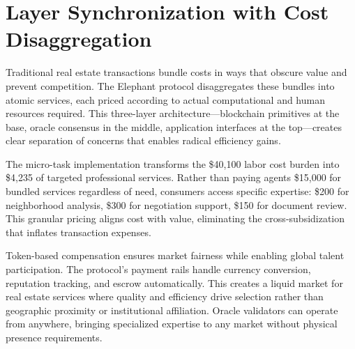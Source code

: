 \section{Layer Synchronization with Cost Disaggregation}

Traditional real estate transactions bundle costs in ways that obscure value and prevent competition. The Elephant protocol disaggregates these bundles into atomic services, each priced according to actual computational and human resources required. This three-layer architecture—blockchain primitives at the base, oracle consensus in the middle, application interfaces at the top—creates clear separation of concerns that enables radical efficiency gains.

The micro-task implementation transforms the \$40{,}100 labor cost burden into \$4{,}235 of targeted professional services. Rather than paying agents \$15{,}000 for bundled services regardless of need, consumers access specific expertise: \$200 for neighborhood analysis, \$300 for negotiation support, \$150 for document review. This granular pricing aligns cost with value, eliminating the cross-subsidization that inflates transaction expenses.

Token-based compensation ensures market fairness while enabling global talent participation. The protocol's payment rails handle currency conversion, reputation tracking, and escrow automatically. This creates a liquid market for real estate services where quality and efficiency drive selection rather than geographic proximity or institutional affiliation. Oracle validators can operate from anywhere, bringing specialized expertise to any market without physical presence requirements.


